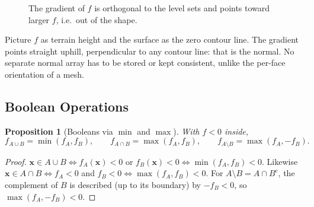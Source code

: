\documentclass[11pt,a4paper]{article}
\newcommand{\vx}{\bm{x}}
\newcommand{\vn}{\bm{n}}
\theoremstyle{definition}
\theoremstyle{plain}
\newtheorem{proposition}[definition]{Proposition}
\theoremstyle{remark}
\begin{document}
\begin{figure}[ht]
\centering
{}
\caption{The gradient of $f$ is orthogonal to the level sets and points toward larger $f$, i.e.\ out of the shape.}
\end{figure}

\begin{intuition}
Picture $f$ as terrain height and the surface as the zero contour line. The gradient points straight uphill, perpendicular to any contour line: that is the normal. No separate normal array has to be stored or kept consistent, unlike the per-face orientation of a mesh.
\end{intuition}

\subsection{Boolean Operations }
\begin{proposition}[Booleans via $\min$ and $\max$]
With $f<0$ inside,
\[
f_{A\cup B}=\min(f_A,f_B),\qquad f_{A\cap B}=\max(f_A,f_B),\qquad f_{A\setminus B}=\max(f_A,-f_B).
\]
\end{proposition}
\begin{proof}
$\vx\in A\cup B\iff f_A(\vx)<0$ or $f_B(\vx)<0\iff\min(f_A,f_B)<0$. Likewise $\vx\in A\cap B\iff f_A<0$ and $f_B<0\iff\max(f_A,f_B)<0$. For $A\setminus B=A\cap B^{c}$, the complement of $B$ is described (up to its boundary) by $-f_B<0$, so $\max(f_A,-f_B)<0$.
\end{proof}
\end{document}
